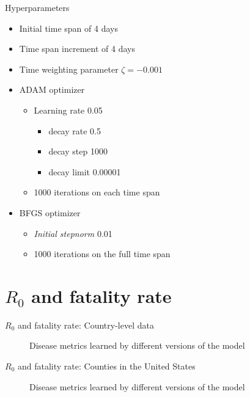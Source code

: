 \begin{frame}{Hyperparameters}
    \begin{itemize}
        \item<1-> Initial time span of 4 days
        \item<1-> Time span increment of 4 days
        \item<2-> Time weighting parameter $\zeta = -0.001$
        \item<3-> ADAM optimizer
        \begin{itemize}
            \item Learning rate 0.05
            \begin{itemize}
                \item decay rate 0.5
                \item decay step 1000
                \item decay limit 0.00001
            \end{itemize}
            \item 1000 iterations on each time span
        \end{itemize}
        \item<4-> BFGS optimizer
        \begin{itemize}
            \item \textit{Initial stepnorm} 0.01
            \item 1000 iterations on the full time span
        \end{itemize}
    \end{itemize}
\end{frame}

\section{$R_0$ and fatality rate}

\begin{frame}{$R_0$ and fatality rate: Country-level data}
    \begin{figure}[!htb]
        \centering
        \caption{Disease metrics learned by different versions of the model}
    \end{figure}
\end{frame}

\begin{frame}{$R_0$ and fatality rate: Counties in the United States}
    \begin{figure}[!htb]
        \centering
        \caption{Disease metrics learned by different versions of the model}
    \end{figure}
\end{frame}

